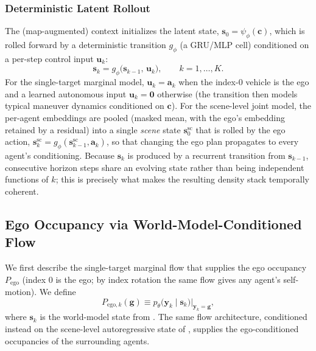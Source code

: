 \documentclass[journal]{IEEEtran}
\begin{document}
\subsubsection{Deterministic Latent Rollout}\label{sec:latent_rollout}
The (map-augmented) context initializes the latent state, $\mathbf{s}_0=\psi_{\phi}(\mathbf{c})$, which is rolled forward by a deterministic transition $g_{\phi}$ (a GRU/MLP cell) conditioned on a per-step control input $\mathbf{u}_k$:
\begin{equation}
\mathbf{s}_k=g_{\phi}\big(\mathbf{s}_{k-1},\,\mathbf{u}_k\big),\qquad k=1,\dots,K.
\label{eq:wm_transition}
\end{equation}
For the single-target marginal model, $\mathbf{u}_k=\mathbf{a}_k$ when the index-$0$ vehicle is the ego and a learned autonomous input $\mathbf{u}_k=\mathbf{0}$ otherwise (the transition then models typical maneuver dynamics conditioned on $\mathbf{c}$). For the scene-level joint model, the per-agent embeddings are pooled (masked mean, with the ego's embedding retained by a residual) into a single \emph{scene} state $\mathbf{s}_0^{\mathrm{sc}}$ that is rolled by the ego action, $\mathbf{s}_k^{\mathrm{sc}}=g_{\phi}(\mathbf{s}_{k-1}^{\mathrm{sc}},\mathbf{a}_k)$, so that changing the ego plan propagates to every agent's conditioning. Because $\mathbf{s}_k$ is produced by a recurrent transition from $\mathbf{s}_{k-1}$, consecutive horizon steps share an evolving state rather than being independent functions of $k$; this is precisely what makes the resulting density stack temporally coherent.

\subsection{Ego Occupancy via World-Model-Conditioned Flow}\label{sec:collision_probability}
We first describe the single-target marginal flow that supplies the ego occupancy $P_{\mathrm{ego}}$ (index $0$ is the ego; by index rotation the same flow gives any agent's self-motion). We define
\begin{equation}
P_{\mathrm{ego},k}(\mathbf{g})\equiv p_{\theta}\big(\mathbf{y}_k\mid\mathbf{s}_k\big)\big|_{\mathbf{y}_k=\mathbf{g}},
\label{eq:pk_def}
\end{equation}
where $\mathbf{s}_k$ is the world-model state from . The same flow architecture, conditioned instead on the scene-level autoregressive state of , supplies the ego-conditioned occupancies of the surrounding agents.
\end{document}
